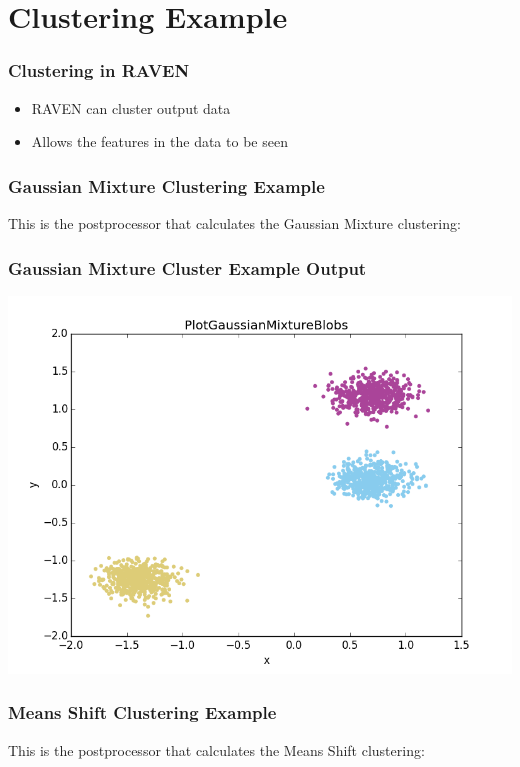 \documentclass[t,9pt,svgnames]{beamer}
\begin{document}
\section{Clustering Example}

\begin{frame}
  \frametitle{Clustering in RAVEN}
  \begin{itemize}
  \item RAVEN can cluster output data
  \item Allows the features in the data to be seen
  \end{itemize}
\end{frame}

\begin{frame}[fragile]
  \frametitle{Gaussian Mixture Clustering Example}
  This is the postprocessor that calculates the Gaussian Mixture clustering:
  

\end{frame}

\begin{frame}
  \frametitle{Gaussian Mixture Cluster Example Output}
  \includegraphics[width=\textwidth]{images/PlotGaussianMixture.png}
\end{frame}

\begin{frame}[fragile]
  \frametitle{Means Shift Clustering Example}
  This is the postprocessor that calculates the Means Shift clustering:
  
\end{frame}
\end{document}
